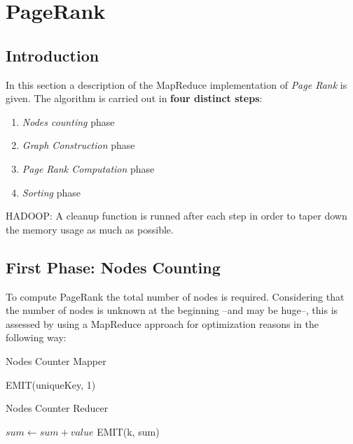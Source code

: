 \section{PageRank}

\subsection{Introduction}
In this section a description of the MapReduce implementation of \textit{Page Rank} is given.
The algorithm is carried out in \textbf{four distinct steps}:
\begin{enumerate}
	\item \textit{Nodes counting} phase
	\item \textit{Graph Construction} phase
	\item \textit{Page Rank Computation} phase
	\item \textit{Sorting} phase
\end{enumerate}
HADOOP: A cleanup function is runned after each step in order to taper down the memory usage as much as possible.



\subsection{First Phase: Nodes Counting}
To compute PageRank the total number of nodes is required. Considering that the number of nodes is unknown at the beginning –and may be huge–, this is assessed by using a MapReduce approach for optimization reasons in the following way:


\begin{algorithm}[H]
	\caption{Nodes Counter Mapper}\label{Mapper}
		\begin{algorithmic}[1]
						\State EMIT(uniqueKey, 1) 
					\EndIf
			\EndProcedure
	\end{algorithmic}
\end{algorithm}


\begin{algorithm}[H]
	\caption{Nodes Counter Reducer}\label{Reducer}
		\begin{algorithmic}[1]
						\State $sum \gets sum + value$
					\EndFor
					\State EMIT(k, sum)
			\EndProcedure
	\end{algorithmic}
\end{algorithm}


